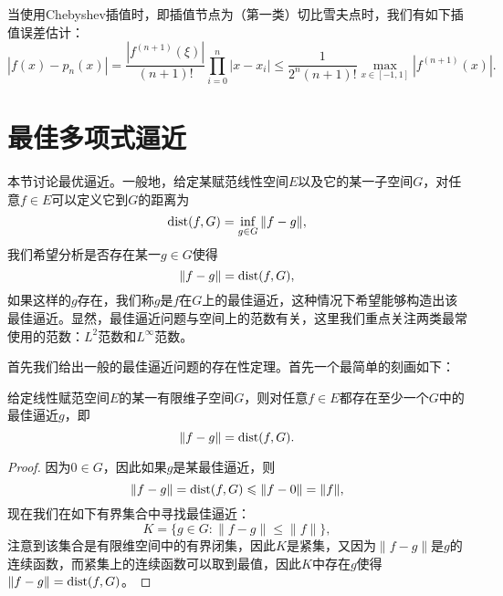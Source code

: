 \documentclass[a4paper,10pt]{ctexart}
\begin{document}
当使用Chebyshev插值时，即插值节点为（第一类）切比雪夫点时，我们有如下插值误差估计：
\begin{equation}
    |f(x)-p_n(x)|=\frac{|f^{(n+1)}(\xi)|}{(n+1)!}\prod_{i=0}^{n}|x-x_i|\leqslant \frac{1}{2^n(n+1)!}\max_{x\in [-1,1]}|f^{(n+1)}(x)|.
\end{equation}

\section{最佳多项式逼近}
本节讨论最优逼近。一般地，给定某赋范线性空间$ E $以及它的某一子空间$ G $，对任意$ f\in E $可以定义它到$ G $的距离为
\begin{equation}
    {\rm dist}(f,G) = \inf_{g\in G}\|f-g\|,
\end{equation}
我们希望分析是否存在某一$ g\in G $使得
\begin{equation}
    \|f-g\| = {\rm dist}(f,G),
\end{equation}
如果这样的$ g $存在，我们称$ g $是$ f $在$ G $上的最佳逼近，这种情况下希望能够构造出该最佳逼近。显然，最佳逼近问题与空间上的范数有关，这里我们重点关注两类最常使用的范数：$ L^2 $范数和$ L^\infty $范数。

首先我们给出一般的最佳逼近问题的存在性定理。首先一个最简单的刻画如下：
\begin{theorem}
    给定线性赋范空间$ E $的某一有限维子空间$ G $，则对任意$ f\in E $都存在至少一个$ G $中的最佳逼近$ g $，即
    \begin{equation}
        \|f-g\| = {\rm dist}(f,G).
    \end{equation}
\end{theorem}
\begin{proof}
    因为$ 0\in G $，因此如果$ g $是某最佳逼近，则
    \[
        \|f-g\| = {\rm dist}(f,G) \leqslant  \|f-0\| = \|f\|,
    \]
    现在我们在如下有界集合中寻找最佳逼近：
    \begin{equation}
        K = \{g\in G: \| f-g \|\leqslant \| f \|  \},
    \end{equation}
    注意到该集合是有限维空间中的有界闭集，因此$ K $是紧集，又因为$ \| f-g \| $是$ g $的连续函数，而紧集上的连续函数可以取到最值，因此$ K $中存在$ g $使得$ \| f-g \| = {\rm dist}(f,G) $。
\end{proof}
\end{document}

